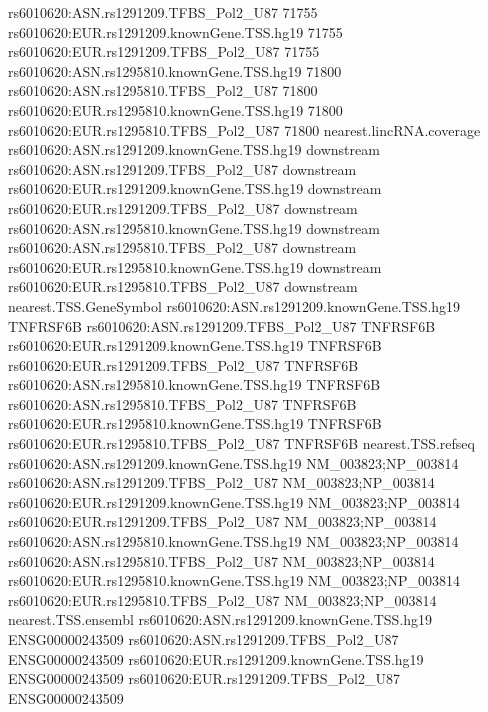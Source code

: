 \documentclass[a4paper]{article}
\begin{document}
\begin{Schunk}
\begin{Soutput}
rs6010620:ASN.rs1291209.TFBS_Pol2_U87                                  71755
rs6010620:EUR.rs1291209.knownGene.TSS.hg19                             71755
rs6010620:EUR.rs1291209.TFBS_Pol2_U87                                  71755
rs6010620:ASN.rs1295810.knownGene.TSS.hg19                             71800
rs6010620:ASN.rs1295810.TFBS_Pol2_U87                                  71800
rs6010620:EUR.rs1295810.knownGene.TSS.hg19                             71800
rs6010620:EUR.rs1295810.TFBS_Pol2_U87                                  71800
                                           nearest.lincRNA.coverage
rs6010620:ASN.rs1291209.knownGene.TSS.hg19               downstream
rs6010620:ASN.rs1291209.TFBS_Pol2_U87                    downstream
rs6010620:EUR.rs1291209.knownGene.TSS.hg19               downstream
rs6010620:EUR.rs1291209.TFBS_Pol2_U87                    downstream
rs6010620:ASN.rs1295810.knownGene.TSS.hg19               downstream
rs6010620:ASN.rs1295810.TFBS_Pol2_U87                    downstream
rs6010620:EUR.rs1295810.knownGene.TSS.hg19               downstream
rs6010620:EUR.rs1295810.TFBS_Pol2_U87                    downstream
                                           nearest.TSS.GeneSymbol
rs6010620:ASN.rs1291209.knownGene.TSS.hg19               TNFRSF6B
rs6010620:ASN.rs1291209.TFBS_Pol2_U87                    TNFRSF6B
rs6010620:EUR.rs1291209.knownGene.TSS.hg19               TNFRSF6B
rs6010620:EUR.rs1291209.TFBS_Pol2_U87                    TNFRSF6B
rs6010620:ASN.rs1295810.knownGene.TSS.hg19               TNFRSF6B
rs6010620:ASN.rs1295810.TFBS_Pol2_U87                    TNFRSF6B
rs6010620:EUR.rs1295810.knownGene.TSS.hg19               TNFRSF6B
rs6010620:EUR.rs1295810.TFBS_Pol2_U87                    TNFRSF6B
                                            nearest.TSS.refseq
rs6010620:ASN.rs1291209.knownGene.TSS.hg19 NM_003823;NP_003814
rs6010620:ASN.rs1291209.TFBS_Pol2_U87      NM_003823;NP_003814
rs6010620:EUR.rs1291209.knownGene.TSS.hg19 NM_003823;NP_003814
rs6010620:EUR.rs1291209.TFBS_Pol2_U87      NM_003823;NP_003814
rs6010620:ASN.rs1295810.knownGene.TSS.hg19 NM_003823;NP_003814
rs6010620:ASN.rs1295810.TFBS_Pol2_U87      NM_003823;NP_003814
rs6010620:EUR.rs1295810.knownGene.TSS.hg19 NM_003823;NP_003814
rs6010620:EUR.rs1295810.TFBS_Pol2_U87      NM_003823;NP_003814
                                           nearest.TSS.ensembl
rs6010620:ASN.rs1291209.knownGene.TSS.hg19     ENSG00000243509
rs6010620:ASN.rs1291209.TFBS_Pol2_U87          ENSG00000243509
rs6010620:EUR.rs1291209.knownGene.TSS.hg19     ENSG00000243509
rs6010620:EUR.rs1291209.TFBS_Pol2_U87          ENSG00000243509

\end{Soutput}
\end{Schunk}
\end{document}
